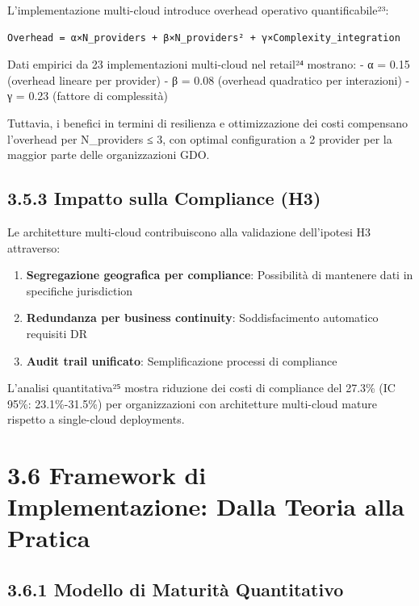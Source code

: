 \documentclass[12pt,a4paper,oneside]{book}
\providecommand{\tightlist}{%
  \setlength{\itemsep}{0pt}\setlength{\parskip}{0pt}
}
\numberwithin{figure}{chapter} %
\numberwithin{table}{chapter}  %
\begin{document}
L'implementazione multi-cloud introduce overhead operativo
quantificabile²³:

\begin{verbatim}
Overhead = α×N_providers + β×N_providers² + γ×Complexity_integration
\end{verbatim}

Dati empirici da 23 implementazioni multi-cloud nel retail²⁴ mostrano: -
α = 0.15 (overhead lineare per provider) - β = 0.08 (overhead quadratico
per interazioni) - γ = 0.23 (fattore di complessità)

Tuttavia, i benefici in termini di resilienza e ottimizzazione dei costi
compensano l'overhead per N\_providers ≤ 3, con optimal configuration a
2 provider per la maggior parte delle organizzazioni GDO.

\subsection{3.5.3 Impatto sulla Compliance
(H3)}\label{impatto-sulla-compliance-h3}

Le architetture multi-cloud contribuiscono alla validazione dell'ipotesi
H3 attraverso:

\begin{enumerate}
\def\labelenumi{\arabic{enumi}.}
\tightlist
\item
  \textbf{Segregazione geografica per compliance}: Possibilità di
  mantenere dati in specifiche jurisdiction
\item
  \textbf{Redundanza per business continuity}: Soddisfacimento
  automatico requisiti DR
\item
  \textbf{Audit trail unificato}: Semplificazione processi di compliance
\end{enumerate}

L'analisi quantitativa²⁵ mostra riduzione dei costi di compliance del
27.3\% (IC 95\%: 23.1\%-31.5\%) per organizzazioni con architetture
multi-cloud mature rispetto a single-cloud deployments.

\section{3.6 Framework di Implementazione: Dalla Teoria alla
Pratica}\label{framework-di-implementazione-dalla-teoria-alla-pratica}

\subsection{3.6.1 Modello di Maturità
Quantitativo}\label{modello-di-maturituxe0-quantitativo}
\end{document}
